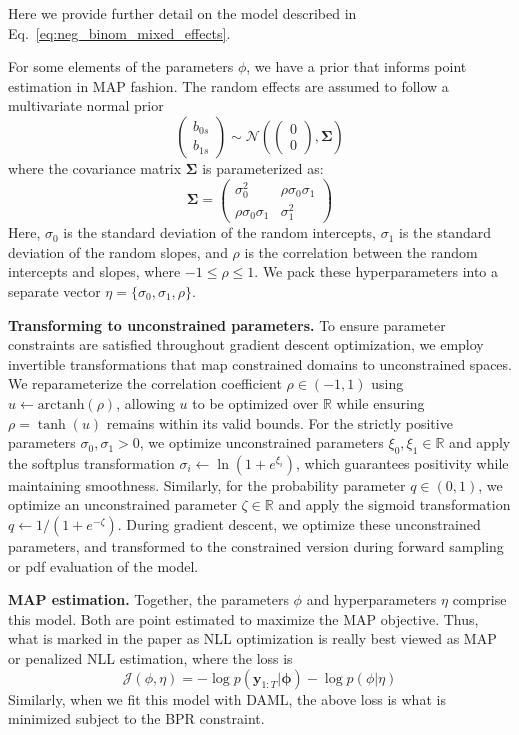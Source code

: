 Here we provide further detail on the model described in Eq.~\eqref{eq:neg_binom_mixed_effects}.

For some elements of the parameters $\phi$, we have a prior that informs point estimation in MAP fashion. 
The random effects are assumed to follow a multivariate normal prior
\begin{equation}
    \begin{pmatrix} b_{0s} \\ b_{1s} \end{pmatrix} \sim \mathcal{N}\left(\begin{pmatrix} 0 \\ 0 \end{pmatrix}, \mathbf{\Sigma}\right)
\end{equation}
where the covariance matrix $\mathbf{\Sigma}$ is parameterized as:
\begin{equation}
    \mathbf{\Sigma} = \begin{pmatrix} 
    \sigma_0^2 & \rho\sigma_0\sigma_1 \\ 
    \rho\sigma_0\sigma_1 & \sigma_1^2 
    \end{pmatrix}
\end{equation}
Here, $\sigma_0$ is the standard deviation of the random intercepts, $\sigma_1$ is the standard deviation of the random slopes, and $\rho$ is the correlation between the random intercepts and slopes, where $-1 \leq \rho \leq 1$. We pack these hyperparameters into a separate vector $\eta = \{\sigma_0, \sigma_1, \rho \}$.

\textbf{Transforming to unconstrained parameters.}
To ensure parameter constraints are satisfied throughout gradient descent optimization, we employ invertible transformations that map constrained domains to unconstrained spaces. We reparameterize the correlation coefficient $\rho \in (-1, 1)$ using $u \gets \text{arctanh}(\rho)$, allowing $u$ to be optimized over $\mathbb{R}$ while ensuring $\rho = \tanh(u)$ remains within its valid bounds. For the strictly positive parameters $\sigma_0, \sigma_1 > 0$, we optimize unconstrained parameters $\xi_0, \xi_1 \in \mathbb{R}$ and apply the softplus transformation $\sigma_i \gets \ln(1 + e^{\xi_i})$, which guarantees positivity while maintaining smoothness. Similarly, for the probability parameter $q \in (0, 1)$, we optimize an unconstrained parameter $\zeta \in \mathbb{R}$ and apply the sigmoid transformation $q \gets 1/(1 + e^{-\zeta})$. During gradient descent, we optimize these unconstrained parameters, and transformed to the constrained version during forward sampling or pdf evaluation of the model.

\textbf{MAP estimation.}
Together, the parameters $\phi$ and hyperparameters $\eta$ comprise this model. 
Both are point estimated to maximize the MAP objective. 
Thus, what is marked in the paper as NLL optimization is really best viewed as MAP or penalized NLL estimation, where the loss is
\begin{equation}
    \mathcal{J}(\phi, \eta) = - \log p(\bm{y}_{1:T} |\bm{\phi}) - \log p( \phi | \eta)
\end{equation}
Similarly, when we fit this model with DAML, the above loss is what is minimized subject to the BPR constraint.